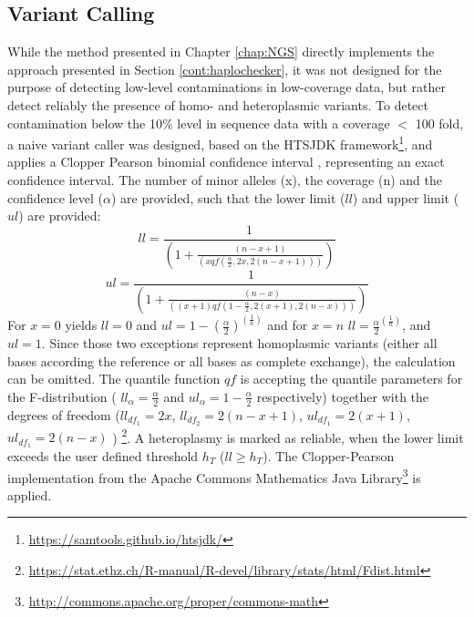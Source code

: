 \subsection{Variant Calling}
While the method presented in Chapter \ref{chap:NGS} directly implements the approach presented in Section \ref{cont:haplochecker}, it was not designed for the purpose of detecting low-level contaminations in low-coverage data, but rather detect reliably the presence of homo- and heteroplasmic variants. To detect contamination below the 10\% level in sequence data with a coverage $<$ 100 fold, a naive variant caller was designed, based on the HTSJDK framework\footnote{\url{https://samtools.github.io/htsjdk/}}, and applies a Clopper Pearson binomial confidence interval \cite{CLOPPER1934}, representing an exact confidence interval. The number of minor alleles (x), the coverage (n) and the confidence level ($\alpha$) are provided, such that the lower limit ($ll$) and upper limit ($ul$) are provided:
\begin{equation}
 ll = \frac{1}{(1 + \frac{(n - x + 1)}{(x qf(\frac{\alpha}{2}, 2 x, 2 (n-x+1)))})}
\end{equation}
\begin{equation}
 ul = \frac{1}{(1 + \frac{(n - x)    }{ ((x + 1)  qf(1-\frac{\alpha}{2}, 2 (x+1), 2 (n-x)))})}
\end{equation}
For $x=0$ yields $ll=0$ and $ul = 1 - (\frac{\alpha}{2})^{(\frac{1}{n})}$ and for $x = n$ $ll = \frac{\alpha}{2}^{(\frac{1}{n})}$, and $ul =1$. Since those two exceptions represent homoplasmic variants (either all bases according the reference or all bases as complete exchange), the calculation can be omitted.
The quantile function $qf$ is accepting the quantile parameters for the F-distribution ( $ll_{\alpha} = \frac{\alpha}{2}$ and $ul_{\alpha}= 1-\frac{\alpha}{2}$ respectively) together with the degrees of freedom ($ll_{df_1} = 2x$, $ll_{df_2} = 2 (n-x+1)$,  $ul_{df_1} =  2 (x+1)$, $ul_{df_1} =  2 (n-x)$ ) \footnote{\url{https://stat.ethz.ch/R-manual/R-devel/library/stats/html/Fdist.html}}. A heteroplasmy is marked as reliable, when the lower limit exceeds the user defined threshold $h_T$ ($ll  \geq h_T$). The Clopper-Pearson implementation from the Apache Commons Mathematics Java Library\footnote{\url{http://commons.apache.org/proper/commons-math}} is applied.

